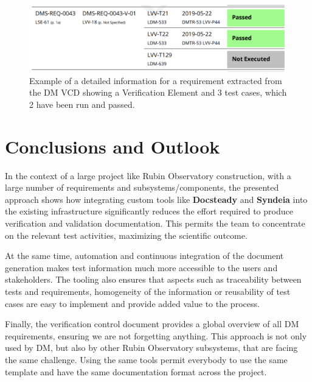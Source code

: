 \begin{figure}
\begin{center}
\includegraphics[width=\textwidth]{imgs/VCDdetail.png}
 \caption{Example of a detailed information for a requirement extracted from the DM VCD 
 showing a Verification Element and 3 test cases, which 2 have been run and passed.}
 \label{fig:vcddetail}
\end{center}
\end{figure}
\section{Conclusions and Outlook}

In the context of a large project like Rubin Observatory construction, with a large number of requirements
and subsystems/components, the presented approach shows how integrating custom tools like \textbf{Docsteady}
and \textbf{Syndeia} into the existing infrastructure significantly reduces the effort
required to produce verification and validation documentation.
This permits the team to concentrate on the relevant test activities, maximizing the scientific outcome.

At the same time, automation and continuous integration of the document generation makes test information
much more accessible to the users and stakeholders.
The tooling also ensures that aspects such as traceability between tests and requirements, homogeneity of the information
or reusability of test cases are easy to implement and provide added value to the process.

Finally, the verification control document provides a global overview of all DM requirements, ensuring we are not forgetting anything.
This approach is not only used by DM, but also by other Rubin Observatory subsystems, that are facing the same challenge.
Using the same tools permit everybody to use the same template and have the same documentation format across the project.


